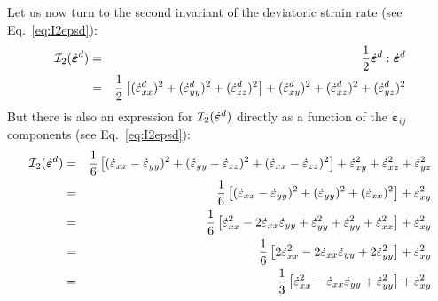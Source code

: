 Let us now turn to the second invariant of the deviatoric strain rate 
(see Eq.~\eqref{eq:I2epsd}):
\begin{eqnarray}
{\cal I}_2(\dot{\bm{\varepsilon}}^d)
&=& \frac{1}{2} \dot{\bm{\varepsilon}}^d:\dot{\bm{\varepsilon}}^d \\
&=& \frac{1}{2} \left[ (\dot{\varepsilon}_{xx}^d)^2 + (\dot{\varepsilon}_{yy}^d)^2 + (\dot{\varepsilon}_{zz}^d)^2   \right] 
+ (\dot{\varepsilon}_{xy}^d)^2  
+ (\dot{\varepsilon}_{xz}^d)^2  
+ (\dot{\varepsilon}_{yz}^d)^2  
\end{eqnarray}
But there is also an expression for ${\cal I}_2(\dot{\bm{\varepsilon}}^d)$ directly as a function of the $\dot{\bm\varepsilon}_{ij}$ components 
(see Eq.~\eqref{eq:I2epsd}):
\begin{eqnarray}
{\cal I}_2(\dot{\bm{\varepsilon}}^d)
&=& \frac{1}{6} \left[ (\dot{\varepsilon}_{xx}-\dot{\varepsilon}_{yy})^2 
+ (\dot{\varepsilon}_{yy}-\dot{\varepsilon}_{zz})^2 
+ (\dot{\varepsilon}_{xx}-\dot{\varepsilon}_{zz})^2 \right] 
+ \dot{\varepsilon}_{xy}^2 + \dot{\varepsilon}_{xz}^2 + \dot{\varepsilon}_{yz}^2 \\
&=& 
\frac{1}{6} \left[ (\dot{\varepsilon}_{xx}-\dot{\varepsilon}_{yy})^2 
+ (\dot{\varepsilon}_{yy})^2 
+ (\dot{\varepsilon}_{xx})^2 \right] 
+ \dot{\varepsilon}_{xy}^2 \\
&=& \frac{1}{6} \left[ \dot{\varepsilon}_{xx}^2 
-2\dot{\varepsilon}_{xx}\dot{\varepsilon}_{yy}
+\dot{\varepsilon}_{yy}^2 
+ \dot{\varepsilon}_{yy}^2 
+ \dot{\varepsilon}_{xx}^2 \right] 
+ \dot{\varepsilon}_{xy}^2 \\
&=& \frac{1}{6} \left[ 
2\dot{\varepsilon}_{xx}^2 
-2\dot{\varepsilon}_{xx}\dot{\varepsilon}_{yy}
+2\dot{\varepsilon}_{yy}^2 
\right] 
+ \dot{\varepsilon}_{xy}^2 \\
&=& 
\frac{1}{3} \left[ 
\dot{\varepsilon}_{xx}^2 
-\dot{\varepsilon}_{xx}\dot{\varepsilon}_{yy}
+\dot{\varepsilon}_{yy}^2 
\right] 
+ \dot{\varepsilon}_{xy}^2 
\end{eqnarray}

